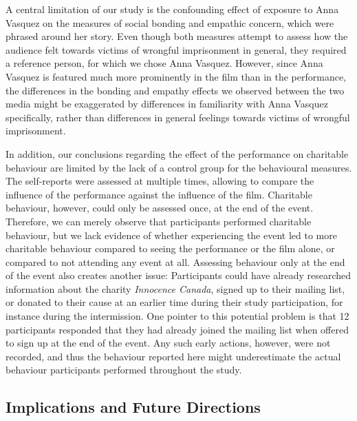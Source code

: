 \documentclass[
  man,floatsintext]{apa6}
\begin{document}
A central limitation of our study is the confounding effect of exposure to Anna Vasquez on the measures of social bonding and empathic concern, which were phrased around her story. Even though both measures attempt to assess how the audience felt towards victims of wrongful imprisonment in general, they required a reference person, for which we chose Anna Vasquez. However, since Anna Vasquez is featured much more prominently in the film than in the performance, the differences in the bonding and empathy effects we observed between the two media might be exaggerated by differences in familiarity with Anna Vasquez specifically, rather than differences in general feelings towards victims of wrongful imprisonment.

In addition, our conclusions regarding the effect of the performance on charitable behaviour are limited by the lack of a control group for the behavioural measures. The self-reports were assessed at multiple times, allowing to compare the influence of the performance against the influence of the film. Charitable behaviour, however, could only be assessed once, at the end of the event. Therefore, we can merely observe that participants performed charitable behaviour, but we lack evidence of whether experiencing the event led to more charitable behaviour compared to seeing the performance or the film alone, or compared to not attending any event at all. Assessing behaviour only at the end of the event also creates another issue: Participants could have already researched information about the charity \emph{Innocence Canada}, signed up to their mailing list, or donated to their cause at an earlier time during their study participation, for instance during the intermission. One pointer to this potential problem is that 12 participants responded that they had already joined the mailing list when offered to sign up at the end of the event. Any such early actions, however, were not recorded, and thus the behaviour reported here might underestimate the actual behaviour participants performed throughout the study.

\subsection{Implications and Future Directions}\label{implications-and-future-directions}
\end{document}
